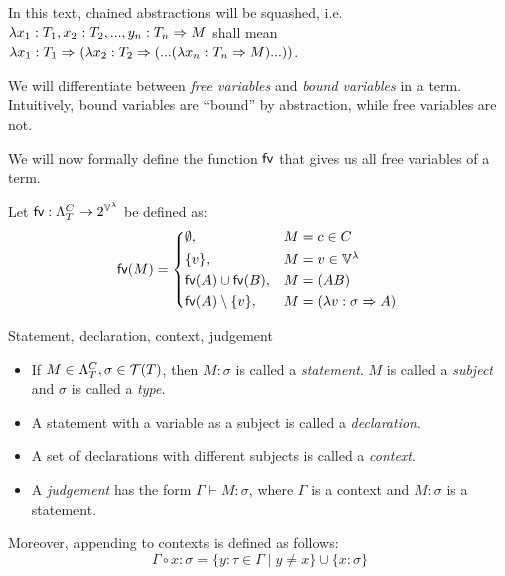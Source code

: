 \documentclass[main.tex]{subfiles}
\begin{document}
\begin{convention}
    In this text, chained abstractions will be squashed, i.e.
    $\lambda x_1 : T_1, x_2: T_2, ..., y_n: T_n \abstr M$ shall mean
    $\lambda x_1 : T_1 \abstr (\lambda x_2: T_2 \abstr (... (\lambda x_n: T_n \abstr M) ...))$.
\end{convention}

We will differentiate between \emph{free variables} and \emph{bound variables}
in a term. Intuitively, bound variables are ``bound'' by abstraction, while
free variables are not.

We will now formally define the function $\fvv$ that gives us all free variables of a
term.
\begin{defn}
    Let $\fvv : \plambda{T}{C} \fun 2^{\lvars}$ be defined as:
    \[
        \fv{M} =
        \begin{cases*}
            \emptyset ,& $M = c \in C$ \\
            \{ v \} ,& $M = v \in \lvars$ \\
            \fv{A} \cup \fv{B} ,& $M = (AB)$ \\
            \fv{A} \setminus \{ v \} ,& $M = (\lambda v : \sigma \abstr A)$ \\
        \end{cases*}
    \]
\end{defn}

\begin{defn}
    \label{def:context}
    Statement, declaration, context, judgement \cite[chap.~2.4]{ttfp}
    \begin{itemize}
        \item If $M \in \plambda{T}{C}, \sigma \in \tclos{T}$, then $M : \sigma$ is called
            a \emph{statement}. $M$ is called a \emph{subject} and $\sigma$
            is called a \emph{type}.
        \item A statement with a variable as a subject is called a \emph{declaration}.
        \item A set of declarations with different subjects is called a \emph{context}.
        \item A \emph{judgement} has the form $\Gamma \vdash M: \sigma$, where
            $\Gamma$ is a context and $M: \sigma$ is a statement.
    \end{itemize}

    Moreover, appending to contexts is defined as follows:
    \[ \Gamma \circ x : \sigma = \{ y : \tau \in \Gamma \mid y \neq x \}
       \cup \{ x : \sigma \} \]
\end{defn}
\end{document}
